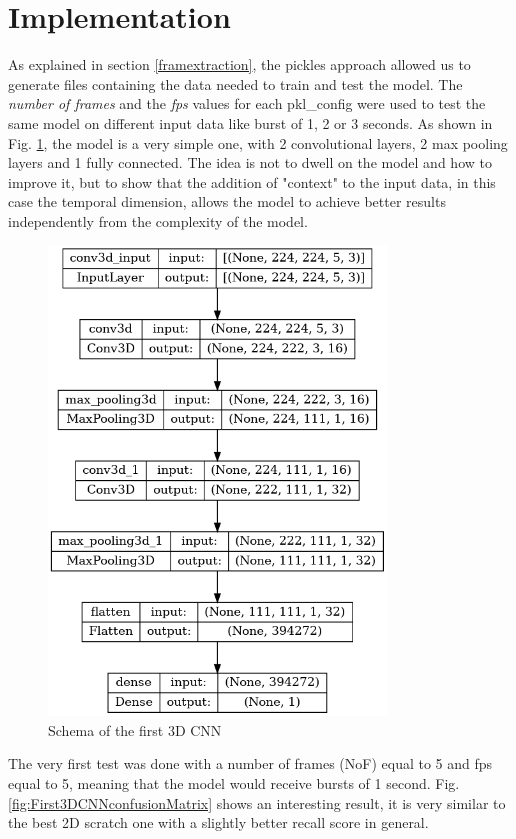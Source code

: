 \section{Implementation}
As explained in section \ref{framextraction}, the pickles approach allowed us to generate files containing the data needed to train and test the model. The \textit{number of frames} and the \textit{fps} values for each pkl\_config were used to test the same model on different input data like burst of 1, 2 or 3 seconds. As shown in Fig. \ref{fig:3DCNNschema}, the model is a very simple one, with 2 convolutional layers, 2 max pooling layers and 1 fully connected. The idea is not to dwell on the model and how to improve it, but to show that the addition of "context" to the input data, in this case the temporal dimension, allows the model to achieve better results independently from the complexity of the model.
\begin{figure}[]
    \centering
    \includegraphics[width=0.8\textwidth, height=0.6\textwidth, keepaspectratio]{images/3D9CNNschema.png}
    \caption{Schema of the first 3D CNN}
    \label{fig:3DCNNschema}
\end{figure}

The very first test was done with a number of frames (NoF) equal to 5 and fps equal to 5, meaning that the model would receive bursts of 1 second. Fig. \ref{fig:First3DCNNconfusionMatrix} shows an interesting result, it is very similar to the best 2D scratch one with a slightly better recall score in general.

